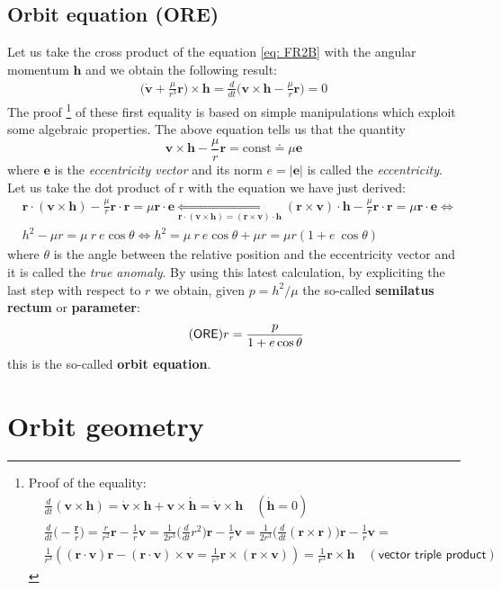 \subsection{Orbit equation (ORE)}
Let us take the cross product of the equation \ref{eq: FR2B} with the angular momentum $\mathbf{h}$ and we obtain the following result:
{\large{
    \begin{align*}
        \biggl(
            \dot{\mathbf{v}} +  \frac{\mu}{r^3}\mathbf{r}
        \biggr) \times \mathbf{h} = 
        \frac{d}{dt}\biggl(
            \mathbf{v} \times \mathbf{h} - \frac{\mu}{r}\mathbf{r}
        \biggr)=0
    \end{align*}
}}
The proof
\footnote[8]{Proof of the equality: \begin{align*}
    &\frac{d}{dt}(\mathbf{v}\times\mathbf{h}) = \dot{\mathbf{v}}\times\mathbf{h} + \mathbf{v} \times \dot{\mathbf{h}}= \mathbf{\dot{v}} \times \mathbf{h} \quad (\dot{\mathbf{h}}=0) \\
    &\frac{d}{dt}\biggl(
        -\frac{\mathbf{r}}{r}
    \biggr) = \frac{\dot{r}}{r^2} \mathbf{r} - \frac{1}{r}\mathbf{v} = \frac{1}{2r^3}\biggl(
        \frac{d}{dt} r^2
    \biggr) \mathbf{r} - \frac{1}{r}\mathbf{v} = \frac{1}{2r^3}\biggl(
        \frac{d}{dt} (\mathbf{r} \times \mathbf{r})
    \biggr) \mathbf{r} - \frac{1}{r}\mathbf{v}=\\
    &\frac{1}{r^3} ((\mathbf{r} \cdot \mathbf{v})\mathbf{r}-(\mathbf{r} \cdot \mathbf{v})\times \mathbf{v}=\frac{1}{r^3}\mathbf{r}\times(\mathbf{r}\times\mathbf{v}))=\frac{1}{r^3}\mathbf{r}\times\mathbf{h} \quad (\textsf{vector triple product})
\end{align*}}
of these first equality is based on simple manipulations which exploit some algebraic properties.
The above equation tells us that the quantity
$$
\mathbf{v} \times \mathbf{h} - \frac{\mu}{r}\mathbf{r}=\text{const} \doteq \mu\mathbf{e}
$$
where $\mathbf{e}$ is the \textit{eccentricity vector} and its norm $e=\vert \mathbf{e} \vert$ is called the \textit{eccentricity}. Let us take the dot product of r with the equation we have just derived:
\begin{align*}
    &\mathbf{r}\cdot (\mathbf{v} \times \mathbf{h}) - \frac{\mu}{r}\mathbf{r}\cdot\mathbf{r}=\mu\mathbf{r}\cdot\mathbf{e} \underset{\mathbf{r}\cdot (\mathbf{v} \times \mathbf{h})=(\mathbf{r}\times\mathbf{v})\cdot \mathbf{h}}{\iff} 
    (\mathbf{r}\times\mathbf{v})\cdot \mathbf{h} - \frac{\mu}{r}\mathbf{r}\cdot\mathbf{r}=\mu\mathbf{r}\cdot\mathbf{e}\iff\\
    &h^2 - \mu r = \mu \ r \ e \cos\theta \iff 
    h^2 = \mu \ r \ e \cos\theta + \mu r = \mu r(1+e \ \cos\theta)
\end{align*}
where $\theta$ is the angle between the relative position and the eccentricity vector and it is called the \textit{true anomaly}. By using this latest calculation, by expliciting the last step with respect to $r$ we obtain, given $p=h^2/\mu$ the so-called \textbf{semilatus rectum} or \textbf{parameter}:
{\large{
    \begin{equation} \tag{\textsf{ORE}} \label{eq:ORE}
        r = \frac{p}{1+e \cos\theta}
    \end{equation}
}}
this is the so-called \textbf{orbit equation}.


\section{Orbit geometry}